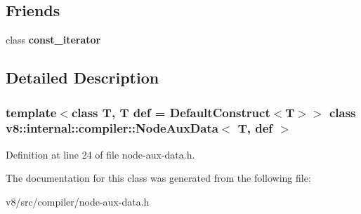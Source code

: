 \subsection*{Friends}
\begin{DoxyCompactItemize}
\item 
\mbox{\label{classv8_1_1internal_1_1compiler_1_1NodeAuxData_ac220ce1c155db1ac44146c12d178056f}} 
class {\bfseries const\+\_\+iterator}
\end{DoxyCompactItemize}


\subsection{Detailed Description}
\subsubsection*{template$<$class T, T  def = Default\+Construct$<$\+T$>$$>$\newline
class v8\+::internal\+::compiler\+::\+Node\+Aux\+Data$<$ T, def $>$}



Definition at line 24 of file node-\/aux-\/data.\+h.



The documentation for this class was generated from the following file\+:\begin{DoxyCompactItemize}
\item 
v8/src/compiler/node-\/aux-\/data.\+h\end{DoxyCompactItemize}
